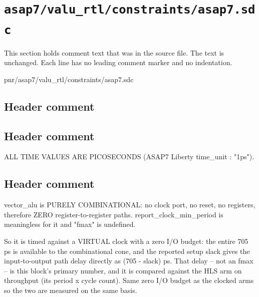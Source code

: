 \section{\texttt{asap7/valu\_rtl/constraints/asap7.sdc}}\label{tm:pd:asap7-valu-rtl-sdc}

This section holds comment text that was in the source file. The text is unchanged. Each line has no leading comment marker and no indentation.

\begin{relocated}{pnr/asap7/valu_rtl/constraints/asap7.sdc}

\subsection*{Header comment}


\subsection*{Header comment}

\begin{textblock}
ALL TIME VALUES ARE PICOSECONDS (ASAP7 Liberty time_unit : "1ps").
\end{textblock}

\subsection*{Header comment}

\begin{textblock}
vector_alu is PURELY COMBINATIONAL: no clock port, no reset, no
registers, therefore ZERO register-to-register paths. report_clock_min_period
is meaningless for it and "fmax" is undefined.

So it is timed against a VIRTUAL clock with a zero I/O budget: the entire 705 ps
is available to the combinational cone, and the reported setup slack gives the
input-to-output path delay directly as (705 - slack) ps. That delay -- not an
fmax -- is this block's primary number, and it is compared against the HLS arm
on throughput (its period x cycle count). Same zero I/O budget as the clocked
arms so the two are measured on the same basis.
\end{textblock}

\end{relocated}

